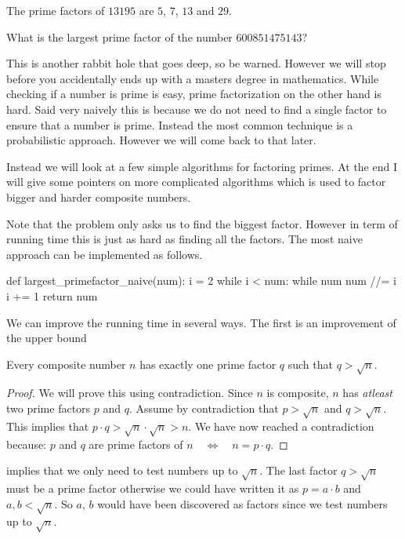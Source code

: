 
\begin{ProjectEuler}{3}
The prime factors of $13195$ are $5$, $7$, $13$ and $29$. \medskip

\noindent What is the largest prime factor of the number $600851475143$?
\end{ProjectEuler}

This is another rabbit hole that goes deep, so be warned. However we will stop before you accidentally 
ends up with a masters degree in mathematics. While checking if a number is prime is easy, prime factorization on the other hand is hard. 
Said very naively this is because we do not need to find a single factor to ensure that a number is prime. Instead the most common
technique is a probabilistic approach. However we will come back to that later. 

Instead we will look at a few simple algorithms for factoring primes. At the end I will give some pointers on more complicated
algorithms which is used to factor bigger and harder composite numbers.

Note that the problem only asks us to find the biggest factor. However in term of running time this is just as hard as finding all the factors. 
The most naive approach can be implemented as follows. 
%
\begin{pythoncode}
def largest_primefactor_naive(num):
    i = 2
    while i < num:
        while num %
            num //= i
        i += 1
    return num
\end{pythoncode}
%
We can improve the running time in several ways. The first is an improvement of the upper bound
\begin{lemma}
\label{lemma:q<sqrt(n)}
Every composite number $n$ has exactly one prime factor $q$ such that $q > \sqrt{n}$.
\end{lemma}
\begin{proof}
	We will prove this using contradiction. Since $n$ is composite, $n$ has \emph{atleast} two prime factors $p$ and $q$. 
	Assume by contradiction that $p > \sqrt{n}$ and $q > \sqrt{n}$. This implies that $p \cdot q > \sqrt{n} \cdot \sqrt{n} > n$.
	We have now reached a contradiction because: $p$ and $q$ are prime factors of $n \quad \Longleftrightarrow \quad  n = p \cdot q$.
\end{proof}
%
 implies that we only need to test numbers up to $\sqrt{n}$. The last factor $q > \sqrt{n}$ must be a prime factor
otherwise we could have written it as $p = a \cdot b$ and $a, b < \sqrt{n}$. So $a$, $b$ would have been discovered as factors
since we test numbers up to $\sqrt{n}$.

